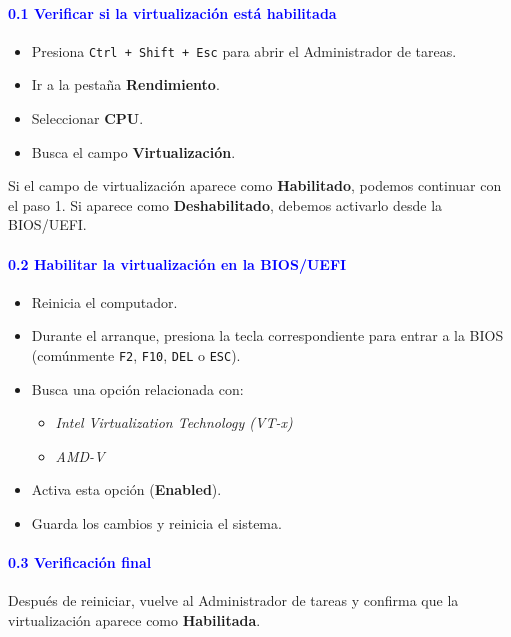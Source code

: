 \documentclass[12pt]{article}
\begin{document}
\paragraph{\textcolor{blue}{0.1 Verificar si la virtualización está habilitada}}

\begin{itemize}
    \item Presiona \texttt{Ctrl + Shift + Esc} para abrir el Administrador de tareas.
    \item Ir a la pestaña \textbf{Rendimiento}.
    \item Seleccionar \textbf{CPU}.
    \item Busca el campo \textbf{Virtualización}.
\end{itemize}
Si el campo de virtualización aparece como \textbf{Habilitado}, podemos continuar con el paso 1. 
Si aparece como \textbf{Deshabilitado}, debemos activarlo desde la BIOS/UEFI.

\paragraph{\textcolor{blue}{0.2 Habilitar la virtualización en la BIOS/UEFI}}

\begin{itemize}
    \item Reinicia el computador.
    \item Durante el arranque, presiona la tecla correspondiente para entrar a la BIOS (comúnmente \texttt{F2}, \texttt{F10}, \texttt{DEL} o \texttt{ESC}).
    \item Busca una opción relacionada con:
    \begin{itemize}
        \item \textit{Intel Virtualization Technology (VT-x)}
        \item \textit{AMD-V}
    \end{itemize}
    \item Activa esta opción (\textbf{Enabled}).
    \item Guarda los cambios y reinicia el sistema.
\end{itemize}

\paragraph{\textcolor{blue}{0.3 Verificación final}}
Después de reiniciar, vuelve al Administrador de tareas y 
confirma que la virtualización aparece como \textbf{Habilitada}.
\end{document}
